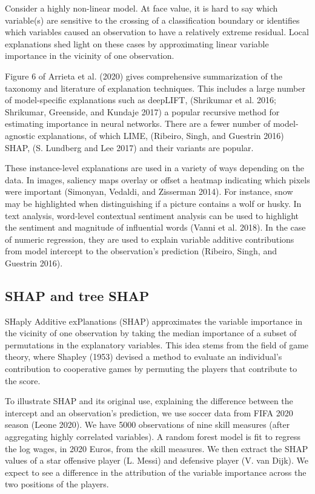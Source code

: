 \documentclass[
  article]{article}
\begin{document}
Consider a highly non-linear model. At face value, it is hard to say which variable(s) are sensitive to the crossing of a classification boundary or identifies which variables caused an observation to have a relatively extreme residual. Local explanations shed light on these cases by approximating linear variable importance in the vicinity of one observation.

Figure 6 of Arrieta et al. (2020) gives comprehensive summarization of the taxonomy and literature of explanation techniques. This includes a large number of model-specific explanations such as deepLIFT, (Shrikumar et al. 2016; Shrikumar, Greenside, and Kundaje 2017) a popular recursive method for estimating importance in neural networks. There are a fewer number of model-agnostic explanations, of which LIME, (Ribeiro, Singh, and Guestrin 2016) SHAP, (S. Lundberg and Lee 2017) and their variants are popular.

These instance-level explanations are used in a variety of ways depending on the data. In images, saliency maps overlay or offset a heatmap indicating which pixels were important (Simonyan, Vedaldi, and Zisserman 2014). For instance, snow may be highlighted when distinguishing if a picture contains a wolf or husky. In text analysis, word-level contextual sentiment analysis can be used to highlight the sentiment and magnitude of influential words (Vanni et al. 2018). In the case of numeric regression, they are used to explain variable additive contributions from model intercept to the observation's prediction (Ribeiro, Singh, and Guestrin 2016).

\hypertarget{shap-and-tree-shap}{%
\subsection{SHAP and tree SHAP}\label{shap-and-tree-shap}}

SHaply Additive exPlanations (SHAP) approximates the variable importance in the vicinity of one observation by taking the median importance of a subset of permutations in the explanatory variables. This idea stems from the field of game theory, where Shapley (1953) devised a method to evaluate an individual's contribution to cooperative games by permuting the players that contribute to the score.

To illustrate SHAP and its original use, explaining the difference between the intercept and an observation's prediction, we use soccer data from FIFA 2020 season (Leone 2020). We have 5000 observations of nine skill measures (after aggregating highly correlated variables). A random forest model is fit to regress the log wages, in 2020 Euros, from the skill measures. We then extract the SHAP values of a star offensive player (L. Messi) and defensive player (V. van Dijk). We expect to see a difference in the attribution of the variable importance across the two positions of the players.
\end{document}
